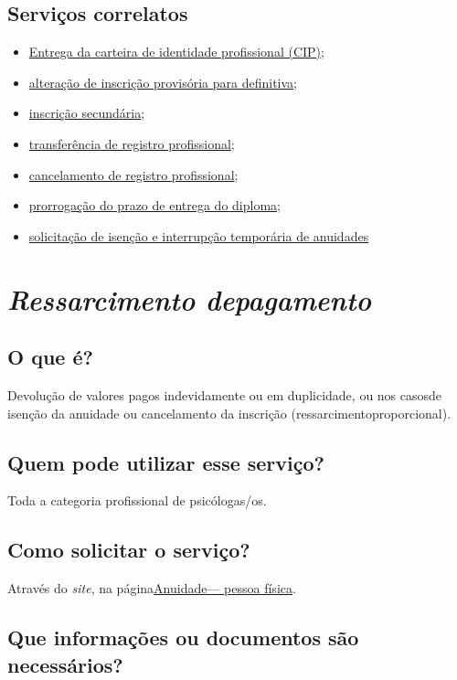 \section{Serviços correlatos}

\begin{itemize}
  \item  \hyperref[]{Entrega  da carteira de identidade profissional (CIP)};
  \item  \hyperref[]{alteração  de inscrição provisória para definitiva};
  \item  \hyperref[]{inscrição secundária};
  \item  \hyperref[]{transferência de  registro profissional};
  \item  \hyperref[]{cancelamento de  registro profissional};
  \item  \hyperref[]{prorrogação  do prazo de entrega do diploma};
  \item  \hyperref[]{solicitação  de isenção e interrupção temporária de anuidades}
\end{itemize}

\chapter{\texorpdfstring{\emph{Ressarcimento depagamento}}{Ressarcimento de pagamento}}


\section{O que é?}

Devolução de valores pagos indevidamente ou em duplicidade, ou nos casosde isenção da anuidade ou cancelamento da inscrição (ressarcimentoproporcional).

\section{Quem pode utilizar esse serviço?}

Toda a categoria profissional de psicólogas/os.

\section{Como solicitar o serviço?}

Através do \emph{site}, na página\href{https://www.crpsp.org/pagina/view/27/anuidade-pessoa-fisica}{Anuidade--- pessoa física}.

\section{Que informações ou documentos são necessários?}

